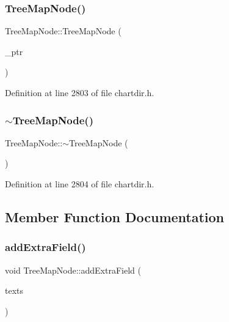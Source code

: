 \subsubsection{\texorpdfstring{Tree\+Map\+Node()}{TreeMapNode()}}
{\footnotesize\ttfamily Tree\+Map\+Node\+::\+Tree\+Map\+Node (\begin{DoxyParamCaption}\item[{Tree\+Map\+Node\+Internal $\ast$}]{\+\_\+ptr }\end{DoxyParamCaption})\hspace{0.3cm}{\ttfamily [inline]}}



Definition at line 2803 of file chartdir.\+h.

\mbox{\label{class_tree_map_node_a4935e0ca788e9111871414766f3c3218}} 
\subsubsection{\texorpdfstring{$\sim$\+Tree\+Map\+Node()}{~TreeMapNode()}}
{\footnotesize\ttfamily Tree\+Map\+Node\+::$\sim$\+Tree\+Map\+Node (\begin{DoxyParamCaption}{ }\end{DoxyParamCaption})\hspace{0.3cm}{\ttfamily [inline]}}



Definition at line 2804 of file chartdir.\+h.



\subsection{Member Function Documentation}
\mbox{\label{class_tree_map_node_a865359bf017ab7cf88a8262eb874b042}} 
\subsubsection{\texorpdfstring{add\+Extra\+Field()}{addExtraField()}\hspace{0.1cm}{\footnotesize\ttfamily [1/2]}}
{\footnotesize\ttfamily void Tree\+Map\+Node\+::add\+Extra\+Field (\begin{DoxyParamCaption}\item[{\hyperlink{class_string_array}{String\+Array}}]{texts }\end{DoxyParamCaption})\hspace{0.3cm}{\ttfamily [inline]}}



